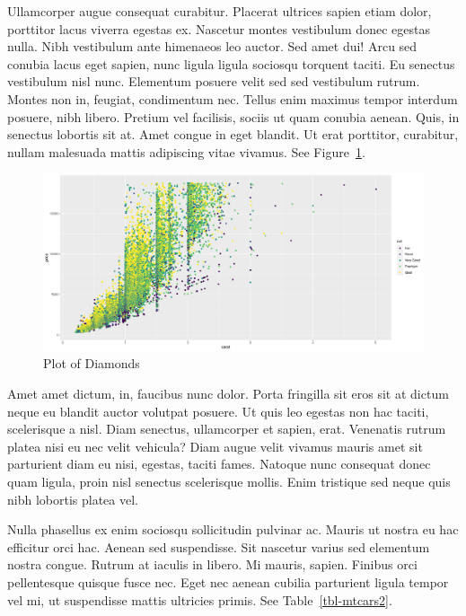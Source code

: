 \documentclass[
  9pt,
  letterpaper,
  DIV=11,
  numbers=noendperiod]{scrartcl}
\begin{document}
Ullamcorper augue consequat curabitur. Placerat ultrices sapien etiam
dolor, porttitor lacus viverra egestas ex. Nascetur montes vestibulum
donec egestas nulla. Nibh vestibulum ante himenaeos leo auctor. Sed amet
dui! Arcu sed conubia lacus eget sapien, nunc ligula ligula sociosqu
torquent taciti. Eu senectus vestibulum nisl nunc. Elementum posuere
velit sed sed vestibulum rutrum. Montes non in, feugiat, condimentum
nec. Tellus enim maximus tempor interdum posuere, nibh libero. Pretium
vel facilisis, sociis ut quam conubia aenean. Quis, in senectus lobortis
sit at. Amet congue in eget blandit. Ut erat porttitor, curabitur,
nullam malesuada mattis adipiscing vitae vivamus. See
Figure~\ref{fig-diamonds2}.

\begin{figure}[t]

\includegraphics[width=1\textwidth,height=\textheight]{man_files/figure-pdf/fig-diamonds2-1.pdf} \hfill{}

\caption{\label{fig-diamonds2}Plot of Diamonds}

\end{figure}

Amet amet dictum, in, faucibus nunc dolor. Porta fringilla sit eros sit
at dictum neque eu blandit auctor volutpat posuere. Ut quis leo egestas
non hac taciti, scelerisque a nisl. Diam senectus, ullamcorper et
sapien, erat. Venenatis rutrum platea nisi eu nec velit vehicula? Diam
augue velit vivamus mauris amet sit parturient diam eu nisi, egestas,
taciti fames. Natoque nunc consequat donec quam ligula, proin nisl
senectus scelerisque mollis. Enim tristique sed neque quis nibh lobortis
platea vel.

Nulla phasellus ex enim sociosqu sollicitudin pulvinar ac. Mauris ut
nostra eu hac efficitur orci hac. Aenean sed suspendisse. Sit nascetur
varius sed elementum nostra congue. Rutrum at iaculis in libero. Mi
mauris, sapien. Finibus orci pellentesque quisque fusce nec. Eget nec
aenean cubilia parturient ligula tempor vel mi, ut suspendisse mattis
ultricies primis. See Table~\ref{tbl-mtcars2}.
\end{document}
